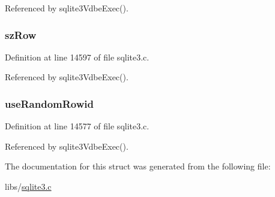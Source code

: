 Referenced by sqlite3\+Vdbe\+Exec().

\hypertarget{struct_vdbe_cursor_a123e55d76daa31b2adbdc8a3ac10cd62}{}
\subsubsection[{sz\+Row}]{ sz\+Row}\label{struct_vdbe_cursor_a123e55d76daa31b2adbdc8a3ac10cd62}


Definition at line 14597 of file sqlite3.\+c.



Referenced by sqlite3\+Vdbe\+Exec().

\hypertarget{struct_vdbe_cursor_aa1fa2ce0c85923d79e8a119d949722a7}{}
\subsubsection[{use\+Random\+Rowid}]{ use\+Random\+Rowid}\label{struct_vdbe_cursor_aa1fa2ce0c85923d79e8a119d949722a7}


Definition at line 14577 of file sqlite3.\+c.



Referenced by sqlite3\+Vdbe\+Exec().



The documentation for this struct was generated from the following file\+:\begin{DoxyCompactItemize}
\item 
libs/\hyperlink{sqlite3_8c}{sqlite3.\+c}\end{DoxyCompactItemize}
